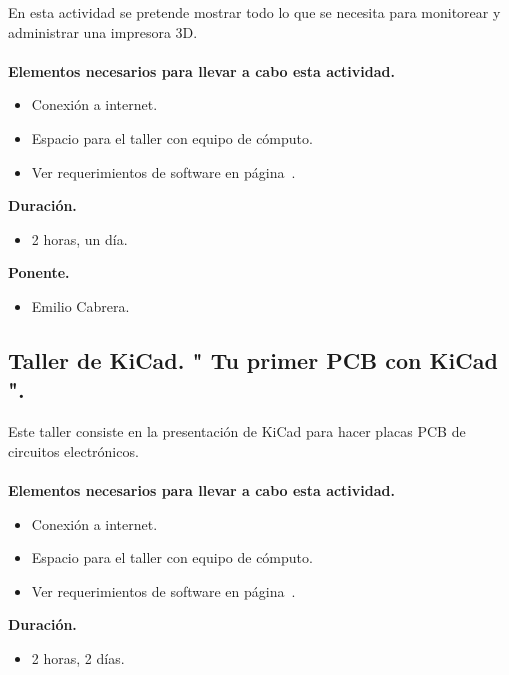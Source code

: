 \documentclass[a4paper,11pt]{article}                 %
\begin{document}
   En esta actividad se pretende mostrar todo lo que se necesita para monitorear y administrar una impresora 3D.
      \paragraph{}
  \textbf{Elementos necesarios para llevar a cabo esta actividad.}
  \begin{itemize}
    \label{list:impresion}
    \item Conexión a internet.
    \item Espacio para el taller con equipo de cómputo.
    \item Ver requerimientos de software en página~\pageref{list:impresions}.
  \end{itemize}
  
  \textbf{Duración.}
  \begin{itemize}
    \item 2 horas, un día.
  \end{itemize}
  
              \textbf{Ponente.}
  \begin{itemize}
    \item Emilio Cabrera.
  \end{itemize}
  
  
              \subsection{Taller de KiCad. " Tu primer PCB con KiCad ".}                                     %

   Este taller consiste en la presentación de KiCad para hacer placas PCB de circuitos electrónicos.
      \paragraph{}
  \textbf{Elementos necesarios para llevar a cabo esta actividad.}
  \begin{itemize}
  \label{list:kicad}
    \item Conexión a internet.
    \item Espacio para el taller con equipo de cómputo.
    \item Ver requerimientos de software en página~\pageref{list:kicads}.
  \end{itemize}
  
  \textbf{Duración.}
  \begin{itemize}
    \item 2 horas, 2 días.
  \end{itemize}
  
\end{document}
